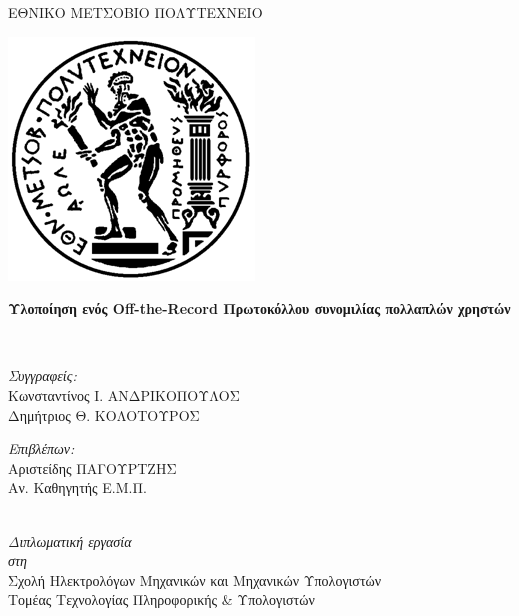\documentclass[
11pt, %
english, %
singlespacing, %
parskip, %
headsepline, %
]{MastersDoctoralThesis} %
\begin{document}
\cleardoublepage

\begin{center}

{\scshape\LARGE ΕΘΝΙΚΟ ΜΕΤΣΟΒΙΟ ΠΟΛΥΤΕΧΝΕΙΟ\par} %
{\centering \includegraphics[scale=0.6]{Pyrforos.png}}
\vspace{1.5cm}
\HRule \\[0.4cm] %
{\huge \bfseries Υλοποίηση ενός Off-the-Record Πρωτοκόλλου συνομιλίας πολλαπλών χρηστών\par}\vspace{0.4cm} %
\HRule \\[1.5cm] %

\begin{minipage}[t]{0.49\textwidth}
\begin{flushleft} \large
\emph{Συγγραφείς:}\\
\small
Κωνσταντίνος Ι. ΑΝΔΡΙΚΟΠΟΥΛΟΣ \\
Δημήτριος Θ. ΚΟΛΟΤΟΥΡΟΣ\\%
\end{flushleft}
\end{minipage}
\begin{minipage}[t]{0.49\textwidth}
\begin{flushright} \large
\emph{Επιβλέπων:} \\
Αριστείδης ΠΑΓΟΥΡΤΖΗΣ\\
Αν. Καθηγητής Ε.Μ.Π.%
\end{flushright}
\end{minipage}\\[3cm]

\large \textit{Διπλωματική εργασία}\\[0.3cm] %
\textit{στη}\\[0.4cm]
  Σχολή Ηλεκτρολόγων Μηχανικών και Μηχανικών Υπολογιστών \\ Τομέας Τεχνολογίας Πληροφορικής \& Υπολογιστών\\[2cm] %



\end{center}
\end{document}

